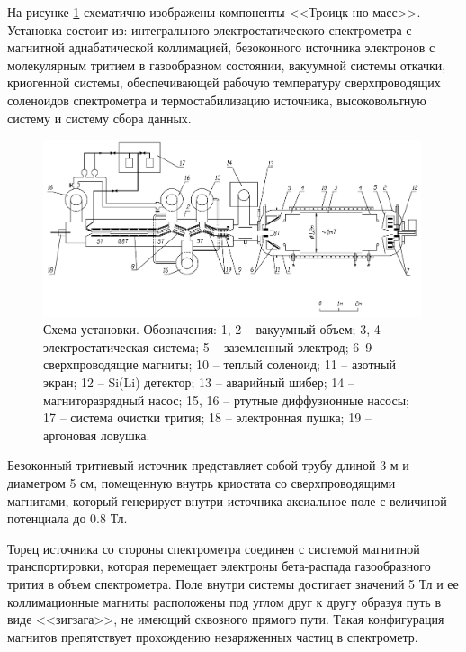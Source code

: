 \documentclass[a4paper,14pt]{extreport}
\begin{document}
На рисунке \ref{fig:numass-general} схематично изображены компоненты <<Троицк ню-масс>>. Установка состоит из: интегрального электростатического спектрометра с магнитной адиабатической коллимацией, безоконного источника электронов с молекулярным тритием в газообразном состоянии, вакуумной системы откачки, криогенной системы, обеспечивающей рабочую температуру сверхпроводящих соленоидов спектрометра и термостабилизацию источника, высоковольтную систему и систему сбора данных.

\begin{figure}
  \centering
  \includegraphics[width = 0.99\textwidth]{img/nu_mass_setup/general.png}
    \caption{Схема установки. Обозначения: 1, 2 – вакуумный объем; 3, 4 – электростатическая система; 5 – заземленный электрод; 6–9 – сверхпроводящие магниты; 10 – теплый соленоид; 11 – азотный экран; 12 – Si(Li) детектор; 13 – аварийный шибер; 14 – магниторазрядный насос; 15, 16 – ртутные диффузионные насосы; 17 – система очистки трития; 18 – электронная пушка; 19 – аргоновая ловушка.}
    \label{fig:numass-general}
\end{figure}

Безоконный тритиевый источник представляет собой трубу длиной 3 м и диаметром 5 см, помещенную внутрь криостата со сверхпроводящими магнитами, который генерирует внутри источника аксиальное поле с величиной потенциала до 0.8 Тл.

Торец источника со стороны спектрометра соединен с системой магнитной транспортировки, которая перемещает электроны бета-распада газообразного трития в объем спектрометра. Поле внутри системы достигает значений 5 Тл и ее коллимационные магниты расположены под углом друг к другу образуя путь в виде <<зигзага>>, не имеющий сквозного прямого пути. Такая конфигурация магнитов препятствует прохождению незаряженных частиц в спектрометр.
\end{document}
